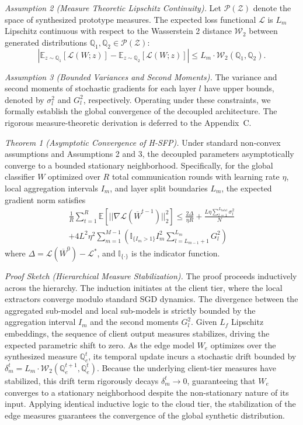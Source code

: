 \noindent\textit{Assumption 2 (Measure Theoretic Lipschitz Continuity).} Let $\mathcal{P}(\mathcal{Z})$ denote the space of synthesized prototype measures. The expected loss functional $\mathcal{L}$ is $L_{m}$ Lipschitz continuous with respect to the Wasserstein 2 distance $\mathcal{W}_2$ between generated distributions $\mathbb{Q}_1, \mathbb{Q}_2 \in \mathcal{P}(\mathcal{Z})$:
\begin{equation}
|\mathbb{E}_{z \sim \mathbb{Q}_1}[\mathcal{L}(W; z)] - \mathbb{E}_{z \sim \mathbb{Q}_2}[\mathcal{L}(W; z)]| \le L_{m} \cdot \mathcal{W}_2(\mathbb{Q}_1, \mathbb{Q}_2).
\end{equation}

\noindent\textit{Assumption 3 (Bounded Variances and Second Moments).} The variance and second moments of stochastic gradients for each layer $l$ have upper bounds, denoted by $\sigma_l^2$ and $G_l^2$, respectively.
Operating under these constraints, we formally establish the global convergence of the decoupled architecture. The rigorous measure-theoretic derivation is deferred to the Appendix~C.

\noindent\textit{Theorem 1 (Asymptotic Convergence of H-SFP).} Under standard non-convex assumptions and Assumptions 2 and 3, the decoupled parameters asymptotically converge to a bounded stationary neighborhood. Specifically, for the global classifier $W$ optimized over $R$ total communication rounds with learning rate $\eta$, local aggregation intervals $I_m$, and layer split boundaries $L_m$, the expected gradient norm satisfies
\begin{multline}
\frac{1}{R}\sum_{t=1}^{R}\mathbb{E}[||\nabla \mathcal{L}(\overline{W}^{t-1})||_2^2] \le \frac{2\Delta}{\eta R} + \frac{L\eta\sum_{l=1}^{L_{\mathrm total}} \sigma_l^2}{N} \\ + 4L^2\eta^2\sum_{m=1}^{M-1}\left(\mathbb{I}_{\{I_m>1\}}I_m^2\sum_{l=L_{m-1}+1}^{L_m} G_l^2\right)
\end{multline}
where $\Delta = \mathcal{L}(\overline{W}^0) - \mathcal{L}^*$, and $\mathbb{I}_{\{\cdot\}}$ is the indicator function.

\noindent\textit{Proof Sketch (Hierarchical Measure Stabilization).} The proof proceeds inductively across the hierarchy. The induction initiates at the client tier, where the local extractors converge modulo standard SGD dynamics. The divergence between the aggregated sub-model and local sub-models is strictly bounded by the aggregation interval $I_m$ and the second moments $G_l^2$. Given $L_f$ Lipschitz embeddings, the sequence of client output measures stabilizes, driving the expected parametric shift to zero. As the edge model $W_e$ optimizes over the synthesized measure $\mathbb{Q}_{e}^t$, its temporal update incurs a stochastic drift bounded by $\delta_m^t = L_{m} \cdot \mathcal{W}_2(\mathbb{Q}_{e}^{t+1}, \mathbb{Q}_{e}^t)$. Because the underlying client-tier measures have stabilized, this drift term rigorously decays $\delta_m^t \to 0$, guaranteeing that $W_e$ converges to a stationary neighborhood despite the non-stationary nature of its input. Applying identical inductive logic to the cloud tier, the stabilization of the edge measures guarantees the convergence of the global synthetic distribution.